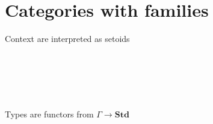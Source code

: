 \section{Categories with families}

Context are interpreted as setoids

\begin{code}\>\<%
\\
%
\\
\> \AgdaSymbol{=} \<%
\\
%
\\
\>\<\end{code}

Types are functors from $\Gamma → \mathbf{Std}$

\begin{code}\>\<%
\\
%
\\
\>  \AgdaSymbol{(} \AgdaSymbol{:} \AgdaSymbol{)} \AgdaSymbol{:}  \<%
\\
\>[0]\<[2]%
\>[2]\<%
\\
\>[2]\<[4]%
\>[4] \<[11]%
\>[11]\AgdaSymbol{:}     \<%
\\
%
\\
\>[2]\<[4]%
\>[4] \AgdaSymbol{:} \AgdaSymbol{\{}  \AgdaSymbol{:}   \AgdaSymbol{\}}  \<[29]%
\>[29]\<%
\\
\>[4]\<[13]%
\>[13]\AgdaFunction{[}  \AgdaFunction{]}    \<%
\\
\>[4]\<[13]%
\>[13]        \<%
\\
%
\\
\>[0]\<[4]%
\>[4] \AgdaSymbol{:}   \AgdaSymbol{:}   \AgdaSymbol{\}}\<%
\\
\>[0]\<[13]%
\>[13]\AgdaSymbol{(} \AgdaSymbol{:} \AgdaFunction{[}  \AgdaFunction{]}   \AgdaSymbol{)}\<%

\end{code}
